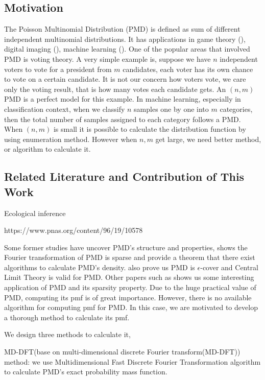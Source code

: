 \documentclass[12pt]{article}
\begin{document}
\subsection{Motivation}

The Poisson Multinomial Distribution (PMD) is defined as sum of different independent multinomial distributions. It has applications in game theory (), digital imaging (), machine learning ().  One of the popular areas that involved PMD is voting theory. A very simple example is, suppose we have $n$ independent voters to vote for a president from $m$ candidates, each voter has its own chance to vote on a certain candidate. It is not our concern how voters vote, we care only the voting result, that is how many votes each candidate gets. An $(n,m)$ PMD is a perfect model for this example. In machine learning, especially in classification context, when we classify $n$ samples one by one into $m$ categories, then the total number of samples assigned to each category follows a PMD. When $(n,m)$ is small it is possible to calculate the distribution function by using enumeration method. However when $n,m$ get large, we need better method, or algorithm to calculate it.




\subsection{Related Literature and Contribution of This Work}

Ecological inference

https://www.pnas.org/content/96/19/10578


Some former studies have uncover PMD's structure and properties,  shows the Fourier transformation of PMD is sparse and provide a theorem that there exist algorithms to calculate PMD's density.  also prove us PMD is $\epsilon$-cover and Central Limit Theory is valid for PMD. Other papers such as  shows us some interesting application of PMD and its sparsity property. Due to the huge practical value of PMD, computing its pmf is of great importance. However, there is no available algorithm for computing pmf for PMD. In this case, we are motivated to develop a thorough method to calculate its pmf.


We design three methods to calculate it,

MD-DFT(base on multi-dimensional discrete Fourier transform(MD-DFT)) method: we use Multidimensional Fast Discrete Fourier Transformation algorithm to calculate PMD's exact probability mass function.
\end{document}
